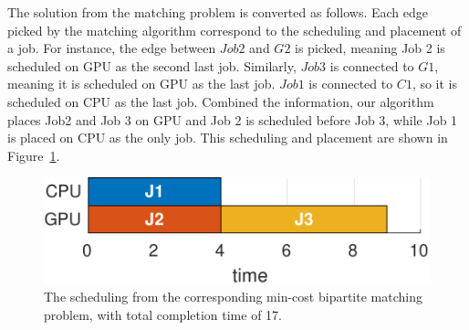 The solution from the matching problem is converted as follows. %
Each edge picked by the matching algorithm correspond to the scheduling and placement of a job. For instance, the edge between $Job2$ and $G2$ is picked, meaning Job 2 is scheduled on GPU as the second last job. Similarly, $Job3$ is connected to $G1$, meaning it is scheduled on GPU as the last job. $Job1$ is connected to $C1$, so it is scheduled on CPU as the last job. 
Combined the information, our algorithm places Job2 and Job 3 on GPU and Job 2 is scheduled before Job 3, while Job 1 is placed on CPU as the only job. 
This scheduling and placement are shown in Figure~\ref{fig:FS_ex}.

\begin{figure}[h]
	\centering
	\includegraphics[width=0.7\linewidth]{figs/FS_ex}
	\caption{The scheduling from the corresponding min-cost bipartite matching problem, with total completion time of 17.}
	\label{fig:FS_ex}
\end{figure}








